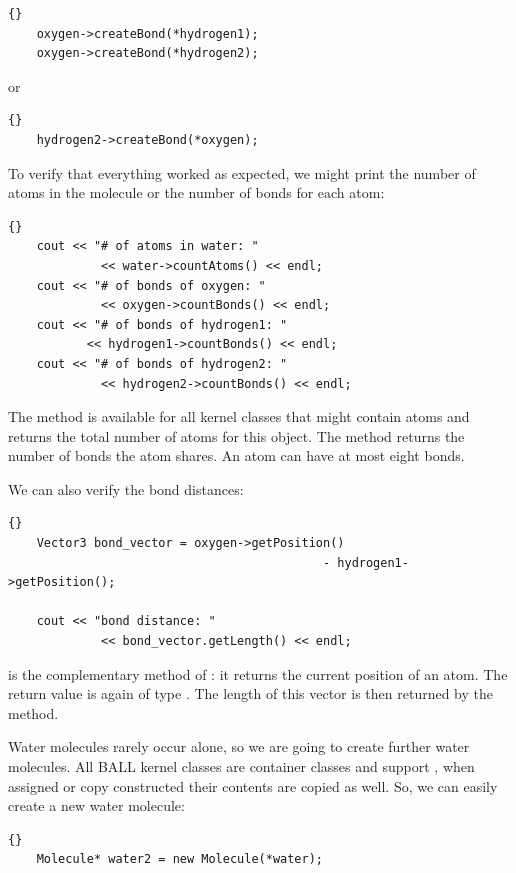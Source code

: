 \begin{lstlisting}{}
	oxygen->createBond(*hydrogen1);
	oxygen->createBond(*hydrogen2);
\end{lstlisting}

or

\begin{lstlisting}{}
	hydrogen2->createBond(*oxygen);
\end{lstlisting}

\noindent
To verify that everything worked as expected, we might print the number of
atoms in the molecule or the number of bonds for each atom:
	
\begin{lstlisting}{}
	cout << "# of atoms in water: " 
 			 << water->countAtoms() << endl;
	cout << "# of bonds of oxygen: " 
			 << oxygen->countBonds() << endl;
	cout << "# of bonds of hydrogen1: " 
		   << hydrogen1->countBonds() << endl;
	cout << "# of bonds of hydrogen2: " 
			 << hydrogen2->countBonds() << endl;
\end{lstlisting}

\noindent
The method  is available for all kernel classes that might
contain atoms and returns the total number of atoms for this object. The
method  returns the number of bonds the atom shares. An
atom can have at most eight bonds.

We can also verify the bond distances:
\begin{lstlisting}{}
	Vector3 bond_vector = oxygen->getPosition() 
										    - hydrogen1->getPosition();

	cout << "bond distance: " 
			 << bond_vector.getLength() << endl;
\end{lstlisting}
	
\noindent
{} is the complementary method of : it
returns the current position of an atom. The return value is again of type
. The length of this vector is then returned by the
 method. 

Water molecules rarely occur alone, so we are going to create further water molecules.
All BALL kernel classes are container classes and support , \ie when assigned or copy constructed their contents are copied as
well. So, we can easily create a new water molecule:

\begin{lstlisting}{}
	Molecule* water2 = new Molecule(*water);
\end{lstlisting}
	
